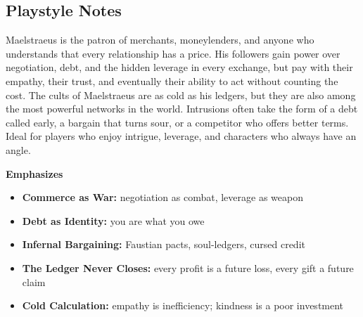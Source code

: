 \subsection*{Playstyle Notes}
Maelstraeus is the patron of merchants, moneylenders, and anyone who understands that every relationship has a price. His followers gain power over negotiation, debt, and the hidden leverage in every exchange, but pay with their empathy, their trust, and eventually their ability to act without counting the cost. The cults of Maelstraeus are as cold as his ledgers, but they are also among the most powerful networks in the world. Intrusions often take the form of a debt called early, a bargain that turns sour, or a competitor who offers better terms. Ideal for players who enjoy intrigue, leverage, and characters who always have an angle.

\noindent\textbf{Emphasizes}
\begin{itemize}
  \item \textbf{Commerce as War:} negotiation as combat, leverage as weapon
  \item \textbf{Debt as Identity:} you are what you owe
  \item \textbf{Infernal Bargaining:} Faustian pacts, soul-ledgers, cursed credit
  \item \textbf{The Ledger Never Closes:} every profit is a future loss, every gift a future claim
  \item \textbf{Cold Calculation:} empathy is inefficiency; kindness is a poor investment
\end{itemize}

